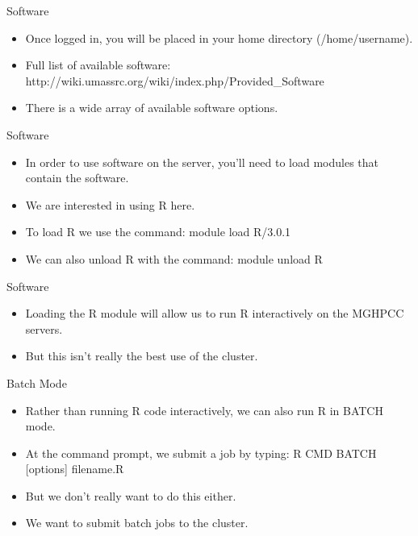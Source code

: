 \begin{frame}{Software}
\begin{itemize}
\item Once logged in, you will be placed in your home directory (/home/username). 
\item Full list of available software: http://wiki.umassrc.org/wiki/index.php/Provided\_Software  
\item There is a wide array of available software options. 
\end{itemize}
\end{frame}

\begin{frame}{Software}
\begin{itemize}
\item In order to use software on the server, you'll need to load modules that contain the software.  
\item We are interested in using R here.  
\item To load R we use the command: module load R/3.0.1
\item We can also unload R with the command:  module unload R
\end{itemize}
\end{frame}

\begin{frame}{Software}
\begin{itemize}
\item Loading the R module will allow us to run R interactively on the MGHPCC servers.  
\item But this isn't really the best use of the cluster.  
\end{itemize}
\end{frame}

\begin{frame}{Batch Mode}
\begin{itemize}
\item Rather than running R code interactively, we can also run R in BATCH mode.  
\item At the command prompt, we submit a job by typing: R CMD BATCH [options] filename.R
\item But we don't really want to do this either.  
\item We want to submit batch jobs to the cluster.  
\end{itemize}
\end{frame}


